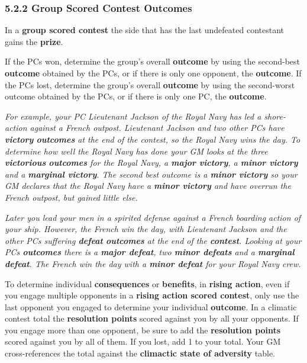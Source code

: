 \documentclass[
]{article}
\begin{document}
\hypertarget{group-scored-contest-outcomes}{%
\subsubsection{5.2.2 Group Scored Contest
Outcomes}\label{group-scored-contest-outcomes}}

In a \textbf{group scored contest} the side that has the last undefeated
contestant gains the \textbf{prize}.

If the PCs won, determine the group's overall \textbf{outcome} by using
the second-best \textbf{outcome} obtained by the PCs, or if there is
only one opponent, the \textbf{outcome}. If the PCs lost, determine the
group's overall \textbf{outcome} by using the second-worst outcome
obtained by the PCs, or if there is only one PC, the \textbf{outcome}.

\emph{For example, your PC Lieutenant Jackson of the Royal Navy has led
a shore-action against a French outpost. Lieutenant Jackson and two
other PCs have \textbf{victory} \textbf{outcomes} at the end of the
contest, so the Royal Navy wins the day. To determine how well the Royal
Navy has done your GM looks at the three \textbf{victorious}
\textbf{outcomes} for the Royal Navy, a \textbf{major victory}, a
\textbf{minor victory} and a \textbf{marginal victory}. The second best
outcome is a \textbf{minor victory} so your GM declares that the Royal
Navy have a \textbf{minor victory} and have overrun the French outpost,
but gained little else.}

\emph{Later you lead your men in a spirited defense against a French
boarding action of your ship. However, the French win the day, with
Lieutenant Jackson and the other PCs suffering \textbf{defeat}
\textbf{outcomes} at the end of the \textbf{contest}. Looking at your
PCs \textbf{outcomes} there is a \textbf{major defeat}, two
\textbf{minor defeats} and a \textbf{marginal defeat}. The French win
the day with a \textbf{minor defeat} for your Royal Navy crew.}

To determine individual \textbf{consequences} or \textbf{benefits}, in
\textbf{rising action}, even if you engage multiple opponents in a
\textbf{rising action scored contest}, only use the last opponent you
engaged to determine your individual \textbf{outcome}. In a climatic
contest total the \textbf{resolution points} scored against you by all
your opponents. If you engage more than one opponent, be sure to add the
\textbf{resolution points} scored against you by all of them. If you
lost, add 1 to your total. Your GM cross-references the total against
the \textbf{climactic state of adversity} table.
\end{document}
